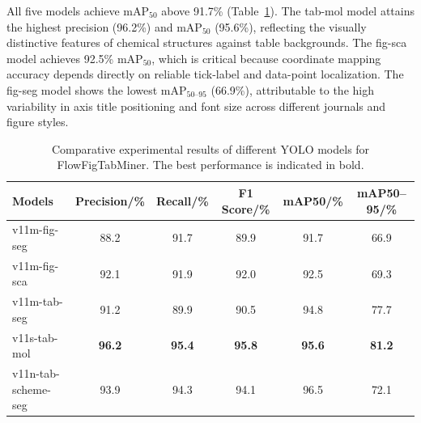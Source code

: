 \documentclass[journal=jcisd8,manuscript=article]{achemso}
\begin{document}
All five models achieve mAP$_{50}$ above 91.7\% (Table~\ref{tab:yolo_results}).
The tab-mol model attains the highest precision (96.2\%) and mAP$_{50}$ (95.6\%), reflecting the visually distinctive features of chemical structures against table backgrounds.
The fig-sca model achieves 92.5\% mAP$_{50}$, which is critical because coordinate mapping accuracy depends directly on reliable tick-label and data-point localization.
The fig-seg model shows the lowest mAP$_{50\text{--}95}$ (66.9\%), attributable to the high variability in axis title positioning and font size across different journals and figure styles.

\begin{table}[htbp]
\centering
\caption{Comparative experimental results of different YOLO models for FlowFigTabMiner. The best performance is indicated in bold.}
\label{tab:yolo_results}
\begin{tabular}{@{}lccccc@{}}
\toprule
\textbf{Models} & \textbf{Precision/\%} & \textbf{Recall/\%} & \textbf{F1 Score/\%} & \textbf{mAP50/\%} & \textbf{mAP50--95/\%} \\ \midrule
v11m-fig-seg  & 88.2 & 91.7 & 89.9 & 91.7 & 66.9 \\
v11m-fig-sca  & 92.1 & 91.9 & 92.0 & 92.5 & 69.3 \\
v11m-tab-seg  & 91.2 & 89.9 & 90.5 & 94.8 & 77.7 \\
v11s-tab-mol  & \textbf{96.2} & \textbf{95.4} & \textbf{95.8} & \textbf{95.6} & \textbf{81.2} \\
v11n-tab-scheme-seg & 93.9 & 94.3 & 94.1 & 96.5 & 72.1 \\
\bottomrule
\end{tabular}
\end{table}


\FloatBarrier
\end{document}
